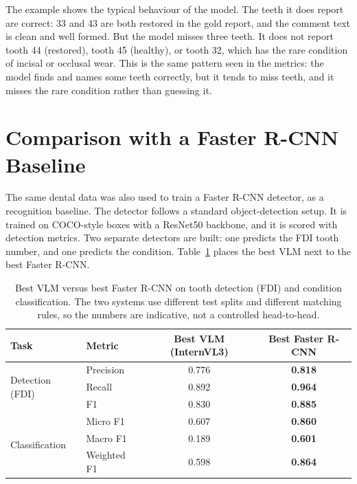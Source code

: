 \documentclass[a4paper,12pt]{report}
\begin{document}
The example shows the typical behaviour of the model. The teeth it does report are correct: 33 and 43 are both restored in the gold report, and the comment text is clean and well formed. But the model misses three teeth. It does not report tooth 44 (restored), tooth 45 (healthy), or tooth 32, which has the rare condition of incisal or occlusal wear. This is the same pattern seen in the metrics: the model finds and names some teeth correctly, but it tends to miss teeth, and it misses the rare condition rather than guessing it.

\section{Comparison with a Faster R-CNN Baseline}
\label{sec:frcnn-compare}

The same dental data was also used to train a Faster R-CNN detector, as a recognition baseline. The detector follows a standard object-detection setup. It is trained on COCO-style boxes with a ResNet50 backbone, and it is scored with detection metrics. Two separate detectors are built: one predicts the FDI tooth number, and one predicts the condition. Table~\ref{tab:frcnn-compare} places the best VLM next to the best Faster R-CNN.

\begin{table}[H]
\centering
\caption{Best VLM versus best Faster R-CNN on tooth detection (FDI) and condition classification. The two systems use different test splits and different matching rules, so the numbers are indicative, not a controlled head-to-head.}
\label{tab:frcnn-compare}
\begin{tabular}{llcc}
\toprule
Task & Metric & Best VLM (InternVL3) & Best Faster R-CNN \\
\midrule
\multirow{3}{*}{Detection (FDI)} & Precision   & 0.776 & \textbf{0.818} \\
                                 & Recall      & 0.892 & \textbf{0.964} \\
                                 & F1          & 0.830 & \textbf{0.885} \\
\midrule
\multirow{3}{*}{Classification}  & Micro F1    & 0.607 & \textbf{0.860} \\
                                 & Macro F1    & 0.189 & \textbf{0.601} \\
                                 & Weighted F1 & 0.598 & \textbf{0.864} \\
\bottomrule
\end{tabular}
\end{table}
\end{document}
